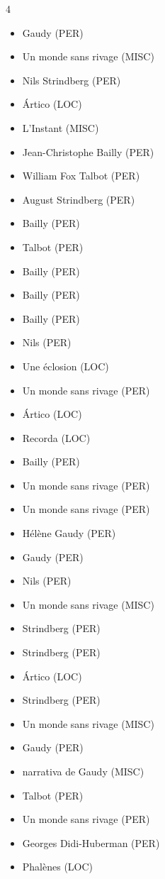 \documentclass{article}
\begin{document}
\begin{multicols}{4}
\begin{itemize}
\item Gaudy (PER)
\item Un monde sans rivage (MISC)
\item Nils Strindberg (PER)
\item Ártico (LOC)
\item L’Instant (MISC)
\item Jean-Christophe Bailly (PER)
\item William Fox Talbot (PER)
\item August Strindberg (PER)
\item Bailly (PER)
\item Talbot (PER)
\item Bailly (PER)
\item Bailly (PER)
\item Bailly (PER)
\item Nils (PER)
\item Une éclosion (LOC)
\item Un monde sans rivage (PER)
\item Ártico (LOC)
\item Recorda (LOC)
\item Bailly (PER)
\item Un monde sans rivage (PER)
\item Un monde sans rivage (PER)
\item Hélène Gaudy (PER)
\item Gaudy (PER)
\item Nils (PER)
\item Un monde sans rivage (MISC)
\item Strindberg (PER)
\item Strindberg (PER)
\item Ártico (LOC)
\item Strindberg (PER)
\item Un monde sans rivage (MISC)
\item Gaudy (PER)
\item narrativa de Gaudy (MISC)
\item Talbot (PER)
\item Un monde sans rivage (PER)
\item Georges Didi-Huberman (PER)
\item Phalènes (LOC)

\end{itemize}
\end{multicols}
\end{document}
